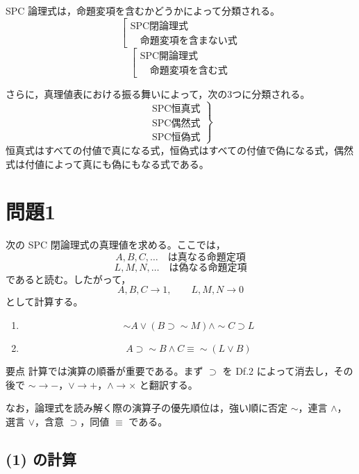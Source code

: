 \documentclass[../main.tex]{subfiles}
\begin{document}
SPC 論理式は，命題変項を含むかどうかによって分類される。
\[
  \left[
  \begin{array}{l}
    \text{SPC閉論理式} \\
    \quad \text{命題変項を含まない式}
  \end{array}
  \right.
\]
\[
  \left[
  \begin{array}{l}
    \text{SPC開論理式} \\
    \quad \text{命題変項を含む式}
  \end{array}
  \right.
\]

さらに，真理値表における振る舞いによって，次の3つに分類される。
\[
  \left.
  \begin{array}{l}
    \text{SPC恒真式} \\
    \text{SPC偶然式} \\
    \text{SPC恒偽式}
  \end{array}
  \right\}
\]
恒真式はすべての付値で真になる式，恒偽式はすべての付値で偽になる式，偶然式は付値によって真にも偽にもなる式である。

\section{問題1}

次の SPC 閉論理式の真理値を求める。ここでは，
\[
  A,B,C,\ldots
  \quad
  \text{は真なる命題定項}
\]
\[
  L,M,N,\ldots
  \quad
  \text{は偽なる命題定項}
\]
であると読む。したがって，
\[
  A,B,C \to 1,
  \qquad
  L,M,N \to 0
\]
として計算する。

\begin{enumerate}[label=(\arabic*)]
  \item
  \[
    \sim A \lor (B \supset \sim M) \land \sim C \supset L
  \]
  \item
  \[
    A \supset \sim B \land C
    \equiv
    \sim (L \lor B)
  \]
\end{enumerate}

\begin{sidebox}[TBred]{要点}
  計算では演算の順番が重要である。まず \(\supset\) を Df.2 によって消去し，その後で \(\sim \to -\)，\(\lor \to +\)，\(\land \to \times\) と翻訳する。

  なお，論理式を読み解く際の演算子の優先順位は，強い順に否定 \(\sim\)，連言 \(\land\)，選言 \(\lor\)，含意 \(\supset\)，同値 \(\equiv\) である。
\end{sidebox}

\subsection{(1) の計算}
\end{document}
